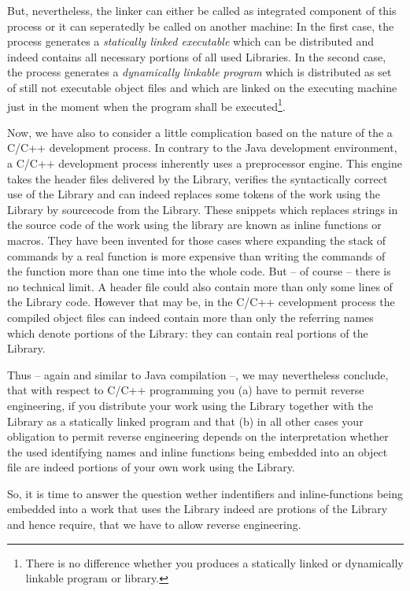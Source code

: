 But, nevertheless, the linker can either be called as integrated component of
this process or it can seperatedly be called on another machine: In the first
case, the process generates a \emph{statically linked executable} which can be
distributed and indeed contains all necessary portions of all used Libraries. In
the second case, the process generates a \emph{dynamically linkable program}
which is distributed as set of still not executable object files and which are
linked on the executing machine just in the moment when the program shall be
executed\footnote{There is no difference whether you produces a statically
linked or dynamically linkable program or library.}.

Now, we have also to consider a little complication based on the nature of the a
C/C++ development process. In contrary to the Java development environment, a
C/C++ development process inherently uses a preprocessor engine.
This engine takes the header files delivered by the Library, verifies the
syntactically correct use of the Library and can indeed replaces some tokens of
the work using the Library by sourcecode from the Library. These snippets which
replaces strings in the source code of the work using the library are known as
inline functions or macros. They have been invented for those cases where
expanding the stack of commands by a real function is more expensive than
writing the commands of the function more than one time into the whole code. But
-- of course -- there is no technical limit. A header file could also contain
more than only some lines of the Library code. However that may be, in the C/C++
cevelopment process the compiled object files can indeed contain more than only
the referring names which denote portions of the Library: they can contain real
portions of the Library.
 
Thus -- again and similar to Java compilation --, we may nevertheless conclude,
that with respect to C/C++ programming you (a) have to permit reverse
engineering, if you distribute your work using the Library together with the
Library as a statically linked program and that (b) in all other cases your
obligation to permit reverse engineering depends on the interpretation whether
the used identifying names and inline functions being embedded into an object
file are indeed portions of your own work using the Library. 

So, it is time to answer the question wether indentifiers and inline-functions
being embedded into a work that uses the Library indeed are protions of the
Library and hence require, that we have to allow reverse engineering.

